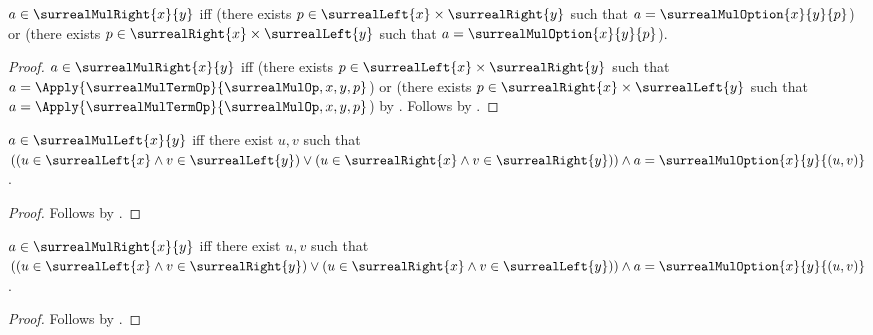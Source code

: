 \begin{proposition}\label{surreal_mul_right_iff}
    $a\in\surrealMulRight{x}{y}$ iff
        (there exists $p\in\surrealLeft{x}\times\surrealRight{y}$
            such that $a=\surrealMulOption{x}{y}{p}$) or
        (there exists $p\in\surrealRight{x}\times\surrealLeft{y}$
            such that $a=\surrealMulOption{x}{y}{p}$).
\end{proposition}
\begin{proof}
    $a\in\surrealMulRight{x}{y}$ iff
        (there exists $p\in\surrealLeft{x}\times\surrealRight{y}$
            such that
            $a=\Apply{\surrealMulTermOp}{\surrealMulOp,x,y,p}$) or
        (there exists $p\in\surrealRight{x}\times\surrealLeft{y}$
            such that
            $a=\Apply{\surrealMulTermOp}{\surrealMulOp,x,y,p}$)
        by .
    Follows by .
\end{proof}

\begin{proposition}\label{surreal_mul_left_pair_iff}
    $a\in\surrealMulLeft{x}{y}$ iff there exist $u,v$ such that
        $((u\in\surrealLeft{x}\land v\in\surrealLeft{y})
          \lor(u\in\surrealRight{x}\land v\in\surrealRight{y}))
         \land a=\surrealMulOption{x}{y}{(u,v)}$.
\end{proposition}
\begin{proof}
    Follows by
        .
\end{proof}

\begin{proposition}\label{surreal_mul_right_pair_iff}
    $a\in\surrealMulRight{x}{y}$ iff there exist $u,v$ such that
        $((u\in\surrealLeft{x}\land v\in\surrealRight{y})
          \lor(u\in\surrealRight{x}\land v\in\surrealLeft{y}))
         \land a=\surrealMulOption{x}{y}{(u,v)}$.
\end{proposition}
\begin{proof}
    Follows by
        .
\end{proof}

